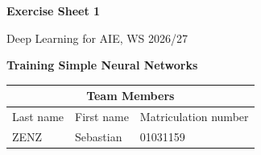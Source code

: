 \documentclass[11pt,a4paper]{article}
\newcommand{\sheetnumber}{1}
\begin{document}
\begin{titlepage}
  \begin{center}
    {\Large \textbf{Exercise Sheet \sheetnumber}}

    \vspace{0.5em}
    Deep Learning for AIE, WS 2026/27

    \vspace{2em}
    {\LARGE \textbf{Training Simple Neural Networks}}
  \end{center}

  \vspace{2em}
  \begin{center}
    \begin{tabular}{|l|l|l|}\hline
      \multicolumn{3}{|c|}{\textbf{Team Members}} \\\hline
      Last name & First name & Matriculation number \\\hline
      ZENZ & Sebastian & 01031159 \\\hline
    \end{tabular}
  \end{center}
\end{titlepage}

\tableofcontents
\clearpage
\end{document}
